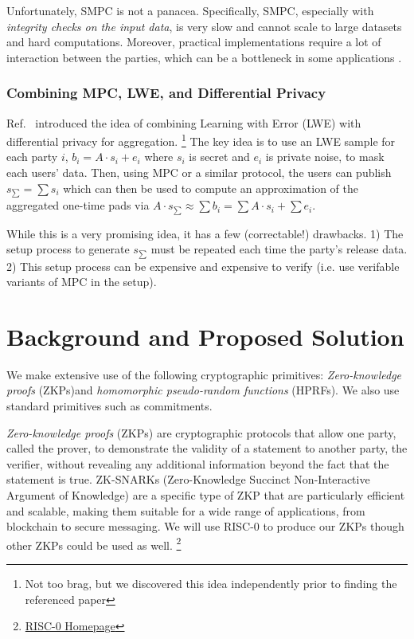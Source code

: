 \documentclass[11pt]{article}
\begin{document}
Unfortunately, SMPC is not a panacea.
Specifically, SMPC, especially with \emph{integrity checks on the input data}, is very slow and cannot scale to large datasets and hard computations.
Moreover, practical implementations require a lot of interaction between the parties, which can be a bottleneck in some applications \cite{zhao2019secure}.

\subsubsection*{Combining MPC, LWE, and Differential Privacy}
Ref.~\cite{stevens2021efficientdifferentiallyprivatesecure} introduced the idea of combining Learning with Error (LWE) with differential privacy for aggregation.
\footnote{Not too brag, but we discovered this idea independently prior to finding the referenced paper}
The key idea is to use an LWE sample for each party $i$, $b_i = A \cdot s_i + e_i$ where $s_i$ is secret and $e_i$ is private noise, to mask each users' data.
Then, using MPC or a similar protocol, the users can publish $s_{\sum} = \sum s_i$ which can then be used to compute an approximation of the aggregated one-time pads via $A \cdot s_{\sum} \approx \sum b_i = \sum A \cdot s_i + \sum e_i$.

While this is a very promising idea, it has a few (correctable!) drawbacks.
1) The setup process to generate $s_{\sum}$ must be repeated each time the party's release data.
2) This setup process can be expensive and expensive to verify (i.e. use verifable variants of MPC in the setup).

\section{Background and Proposed Solution}
We make extensive use of the following cryptographic primitives: \emph{Zero-knowledge proofs} (ZKPs)and \emph{homomorphic pseudo-random functions} (HPRFs).
We also use standard primitives such as commitments.

\emph{Zero-knowledge proofs} (ZKPs) are cryptographic protocols that allow one party, called the prover, to demonstrate the validity of a statement to another party, the verifier, without revealing any additional information beyond the fact that the statement is true. 
ZK-SNARKs (Zero-Knowledge Succinct Non-Interactive Argument of Knowledge) are a specific type of ZKP that are particularly efficient and scalable, making them suitable for a wide range of applications, from blockchain to secure messaging.
We will use RISC-0 to produce our ZKPs though other ZKPs could be used as well.
\footnote{\href{https://risczero.com/}{RISC-0 Homepage}}
\end{document}
